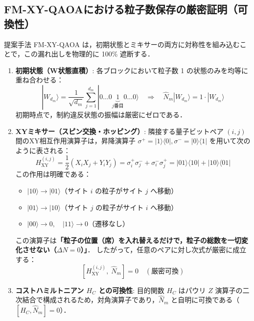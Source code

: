\documentclass[11pt,a4paper]{ltjsarticle}
\newcommand{\ket}[1]{|#1\rangle}
\newcommand{\bra}[1]{\langle#1|}
\begin{document}
\subsection{FM-XY-QAOAにおける粒子数保存の厳密証明（可換性）}
提案手法 FM-XY-QAOA は，初期状態とミキサーの両方に対称性を組み込むことで，この漏れ出しを物理的に 100\% 遮断する．

\begin{enumerate}
    \item \textbf{初期状態（W状態直積）}:
    各ブロックにおいて粒子数 1 の状態のみを均等に重ね合わせる：
    \begin{equation}
    \ket{W_{d_m}} = \frac{1}{\sqrt{d_m}} \sum_{j=1}^{d_m} \ket{0\dots 0 \underbrace{1}_{j\text{番目}} 0\dots 0} \quad \Longrightarrow \quad \hat{N}_m \ket{W_{d_m}} = 1 \cdot \ket{W_{d_m}}
    \end{equation}
    初期時点で，制約違反状態の振幅は厳密にゼロである．

    \item \textbf{XYミキサー（スピン交換・ホッピング）}:
    隣接する量子ビットペア $(i, j)$ 間のXY相互作用演算子は，昇降演算子 $\sigma^+ = \ket{1}\bra{0}, \sigma^- = \ket{0}\bra{1}$ を用いて次のように表される：
    \begin{equation}
    H_{\mathrm{XY}}^{(i, j)} = \frac{1}{2}(X_i X_j + Y_i Y_j) = \sigma_i^+ \sigma_j^- + \sigma_i^- \sigma_j^+ = \ket{01}\bra{10} + \ket{10}\bra{01}
    \end{equation}
    この作用は明確である：
    \begin{itemize}
        \item $\ket{10} \to \ket{01}$（サイト $i$ の粒子がサイト $j$ へ移動）
        \item $\ket{01} \to \ket{10}$（サイト $j$ の粒子がサイト $i$ へ移動）
        \item $\ket{00} \to 0, \quad \ket{11} \to 0$（遷移なし）
    \end{itemize}
    この演算子は\textbf{「粒子の位置（席）を入れ替えるだけで，粒子の総数を一切変化させない（$\Delta N = 0$）」}．
    したがって，任意のペアに対し次式が厳密に成立する：
    \begin{equation}
    \left[ H_{\mathrm{XY}}^{(i, j)}, \; \hat{N}_m \right] = 0 \quad (\text{厳密可換})
    \end{equation}

    \item \textbf{コストハミルトニアン $H_C$ との可換性}:
    目的関数 $H_C$ はパウリ $Z$ 演算子の二次結合で構成されるため，対角演算子であり，$\hat{N}_m$ と自明に可換である（$[H_C, \hat{N}_m] = 0$）．
\end{enumerate}
\end{document}
